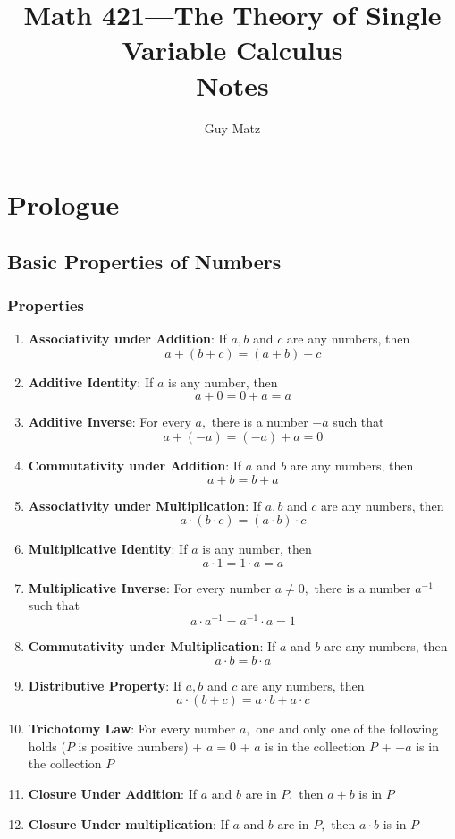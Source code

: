 \documentclass{report}
\title{
  \Huge{Math 421---The Theory of Single Variable Calculus}
  \\
  Notes
}
\author{\huge{Guy Matz}}
\date{}
\begin{document}
\part{Prologue}

\chapter{Basic Properties of Numbers}
\section*{Properties}
\begin{enumerate}

\item \textbf{Associativity under Addition}: If $a, b$ and $c$ are any numbers,
  then
$$ a + (b + c) = (a + b) + c$$

\item \textbf{Additive Identity}:  If $a$ is any number, then 
$$ a + 0  = 0 + a = a$$

\item \textbf{Additive Inverse}: For every $a,$ there is a number $-a$ such that
$$a + (-a) = (-a) + a = 0$$

\item \textbf{Commutativity under Addition}: If $a$ and $b$ are any numbers, then
$$a + b = b + a$$

\item \textbf{Associativity under Multiplication}: If $a, b$ and $c$ are any numbers, then
$$a \cdot (b \cdot c) = (a \cdot b ) \cdot c$$

\item \textbf{Multiplicative Identity}: If $a$ is any number, then
$$ a \cdot 1 = 1 \cdot a = a$$

\item \textbf{Multiplicative Inverse}: For every number $a \neq 0,$ there is a number $a^{-1}$ such that
$$ a \cdot a^{-1} = a^{-1} \cdot a  = 1$$

\item \textbf{Commutativity under Multiplication}: If $a$ and $b$ are any numbers, then
$$a \cdot b = b \cdot a$$

\item \textbf{Distributive Property}: If $a, b$ and $c$ are any numbers, then
$$ a \cdot (b + c) = a \cdot b + a \cdot c$$

\item \textbf{Trichotomy Law}: For every number $a,$ one and only one of the following holds ($P$ is positive numbers)
    + $a = 0$
    + $a$ is in the collection $P$
    + $-a$ is in the collection $P$

  \item \textbf{Closure Under Addition}: If $a$ and $b$ are in $P,$ then $a+b$ is in $P$

  \item \textbf{Closure Under multiplication}: If $a$ and $b$ are in $P,$ then $a \cdot b$ is in $P$

\end{enumerate}
\end{document}
